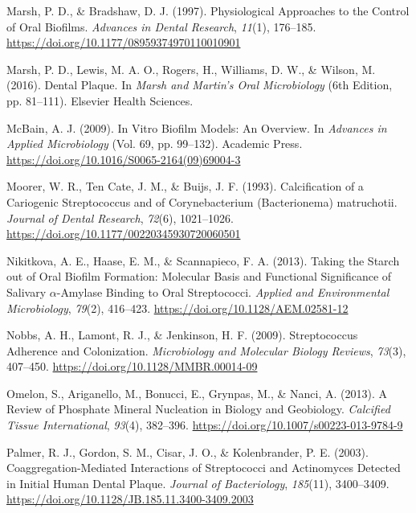 \documentclass[
  b5paper,
]{book}
\newlength{\cslhangindent}
\newlength{\cslentryspacingunit} %
\newenvironment{CSLReferences}[2] %
 {%
  \setlength{\parindent}{0pt}
  \ifodd #1
  \let\oldpar\par
  \def\par{\hangindent=\cslhangindent\oldpar}
  \fi
  \setlength{\parskip}{#2\cslentryspacingunit}
 }%
 {}
\begin{document}
\begin{CSLReferences}{1}{0}
\leavevmode{}%
Marsh, P. D., \& Bradshaw, D. J. (1997). Physiological {Approaches} to
the {Control} of {Oral Biofilms}. \emph{Advances in Dental Research},
\emph{11}(1), 176--185.
\url{https://doi.org/10.1177/08959374970110010901}

\leavevmode{}%
Marsh, P. D., Lewis, M. A. O., Rogers, H., Williams, D. W., \& Wilson,
M. (2016). Dental {Plaque}. In \emph{Marsh and {Martin}'s {Oral
Microbiology}} (6th Edition, pp. 81--111). {Elsevier Health Sciences}.

\leavevmode{}%
McBain, A. J. (2009). In {Vitro Biofilm Models}: {An Overview}. In
\emph{Advances in {Applied Microbiology}} (Vol. 69, pp. 99--132).
{Academic Press}. \url{https://doi.org/10.1016/S0065-2164(09)69004-3}

\leavevmode{}%
Moorer, W. R., Ten Cate, J. M., \& Buijs, J. F. (1993). Calcification of
a {Cariogenic Streptococcus} and of {Corynebacterium} ({Bacterionema})
matruchotii. \emph{Journal of Dental Research}, \emph{72}(6),
1021--1026. \url{https://doi.org/10.1177/00220345930720060501}

\leavevmode{}%
Nikitkova, A. E., Haase, E. M., \& Scannapieco, F. A. (2013). Taking the
{Starch} out of {Oral Biofilm Formation}: {Molecular Basis} and
{Functional Significance} of {Salivary} {\(\alpha\)}-{Amylase Binding}
to {Oral Streptococci}. \emph{Applied and Environmental Microbiology},
\emph{79}(2), 416--423. \url{https://doi.org/10.1128/AEM.02581-12}

\leavevmode{}%
Nobbs, A. H., Lamont, R. J., \& Jenkinson, H. F. (2009). Streptococcus
{Adherence} and {Colonization}. \emph{Microbiology and Molecular Biology
Reviews}, \emph{73}(3), 407--450.
\url{https://doi.org/10.1128/MMBR.00014-09}

\leavevmode{}%
Omelon, S., Ariganello, M., Bonucci, E., Grynpas, M., \& Nanci, A.
(2013). A {Review} of {Phosphate Mineral Nucleation} in {Biology} and
{Geobiology}. \emph{Calcified Tissue International}, \emph{93}(4),
382--396. \url{https://doi.org/10.1007/s00223-013-9784-9}

\leavevmode{}%
Palmer, R. J., Gordon, S. M., Cisar, J. O., \& Kolenbrander, P. E.
(2003). Coaggregation-{Mediated Interactions} of {Streptococci} and
{Actinomyces Detected} in {Initial Human Dental Plaque}. \emph{Journal
of Bacteriology}, \emph{185}(11), 3400--3409.
\url{https://doi.org/10.1128/JB.185.11.3400-3409.2003}


\end{CSLReferences}
\end{document}
